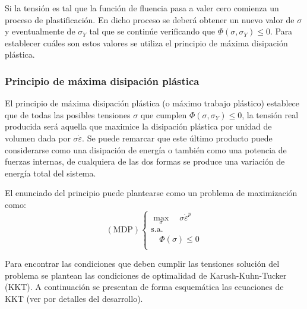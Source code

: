 Si la tensión es tal que la función de fluencia pasa a valer cero comienza un proceso de plastificación. %
%
En dicho proceso se deberá obtener un nuevo valor de $\sigma$ y eventualmente de $\sigma_Y$ tal que se continúe verificando que $\Phi(\sigma,\sigma_Y)\leq 0$. %
%
Para establecer cuáles son estos valores se utiliza el principio de máxima disipación plástica.



\subsubsection{Principio de máxima disipación plástica}

El principio de máxima disipación plástica (o máximo trabajo plástico) establece que de todas las posibles tensiones $\sigma$ que cumplen $\Phi (\sigma, \sigma_Y)\leq 0$, la tensión real producida será aquella que maximice la disipación plástica por unidad de volumen dada por $\sigma \dot{\varepsilon}$. %
%
Se puede remarcar que este último producto puede considerarse como una disipación de energía o también como una potencia de fuerzas internas, de cualquiera de las dos formas se produce una variación de energía total del sistema. 


El enunciado del principio puede plantearse como un problema de maximización como:
%
\begin{equation}
(\text{MDP})\left\{
\begin{array}{l}
\max_\sigma \quad \sigma \dot{\varepsilon}^p\\
\text{s.a.}\\
\quad \Phi(\sigma) \leq 0\\
\end{array}
\right.
\end{equation}

Para encontrar las condiciones que deben cumplir las tensiones solución del problema se plantean las condiciones de optimalidad de Karush-Kuhn-Tucker (KKT). %
%
A continuación se presentan de forma esquemática las ecuaciones de KKT (ver \citep{Luenberger2008} por detalles del desarrollo). %

